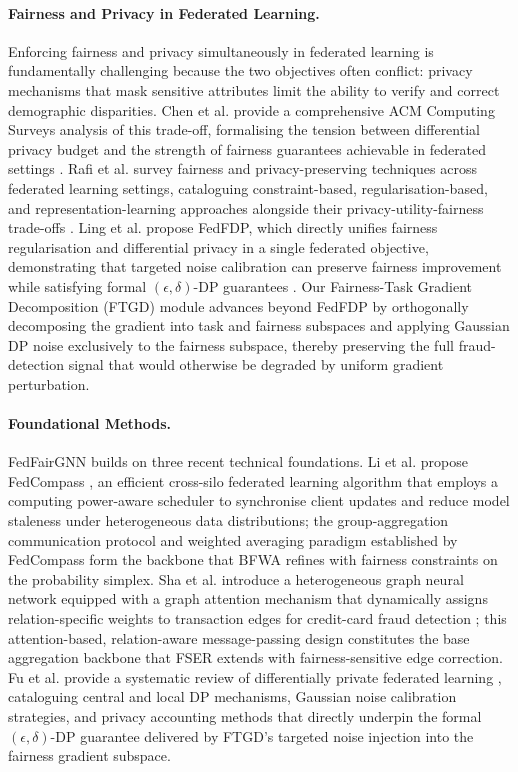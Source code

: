 \documentclass[pmlr]{jmlr}%
\begin{document}
\paragraph{Fairness and Privacy in Federated Learning.} Enforcing fairness and privacy simultaneously in federated learning is fundamentally challenging because the two objectives often conflict: privacy mechanisms that mask sensitive attributes limit the ability to verify and correct demographic disparities. Chen et al. provide a comprehensive ACM Computing Surveys analysis of this trade-off, formalising the tension between differential privacy budget and the strength of fairness guarantees achievable in federated settings \citep{chen2024privacyfairness}. Rafi et al. survey fairness and privacy-preserving techniques across federated learning settings, cataloguing constraint-based, regularisation-based, and representation-learning approaches alongside their privacy-utility-fairness trade-offs \citep{rafi2024fairprivacysurvey}. Ling et al. propose FedFDP, which directly unifies fairness regularisation and differential privacy in a single federated objective, demonstrating that targeted noise calibration can preserve fairness improvement while satisfying formal $(\epsilon,\delta)$-DP guarantees \citep{ling2024fedfdp}. Our Fairness-Task Gradient Decomposition (FTGD) module advances beyond FedFDP by orthogonally decomposing the gradient into task and fairness subspaces and applying Gaussian DP noise exclusively to the fairness subspace, thereby preserving the full fraud-detection signal that would otherwise be degraded by uniform gradient perturbation.

\paragraph{Foundational Methods.} FedFairGNN builds on three recent technical foundations. Li et al. propose FedCompass \citep{li2024fedcompass}, an efficient cross-silo federated learning algorithm that employs a computing power-aware scheduler to synchronise client updates and reduce model staleness under heterogeneous data distributions; the group-aggregation communication protocol and weighted averaging paradigm established by FedCompass form the backbone that BFWA refines with fairness constraints on the probability simplex. Sha et al. introduce a heterogeneous graph neural network equipped with a graph attention mechanism that dynamically assigns relation-specific weights to transaction edges for credit-card fraud detection \citep{sha2025hetgat}; this attention-based, relation-aware message-passing design constitutes the base aggregation backbone that FSER extends with fairness-sensitive edge correction. Fu et al. provide a systematic review of differentially private federated learning \citep{fu2024dpflsurvey}, cataloguing central and local DP mechanisms, Gaussian noise calibration strategies, and privacy accounting methods that directly underpin the formal $(\epsilon,\delta)$-DP guarantee delivered by FTGD's targeted noise injection into the fairness gradient subspace.
\end{document}
